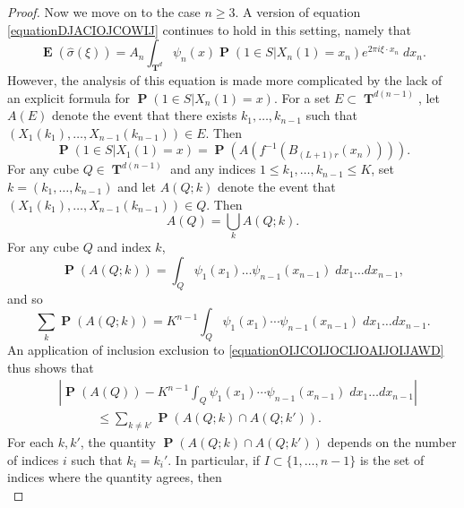 \documentclass[dvipsnames,letterpaper,12pt]{article}
\numberwithin{equation}{section}
\DeclareMathOperator{\TT}{\mathbf{T}}
\numberwithin{theorem}{section}
\DeclareMathOperator{\EE}{\mathbf{E}}
\DeclareMathOperator{\PP}{\mathbf{P}}
\begin{document}
\begin{proof}
    Now we move on to the case $n \geq 3$. A version of equation \eqref{equationDJACIOJCOWIJ} continues to hold in this setting, namely that
    \begin{equation} \label{equationGGIJICJIjjpopwaowarr}
        \EE(\widehat{\sigma}(\xi)) = A_n \int_{\TT^d} \psi_n(x) \PP(1 \in S| X_n(1) = x_n) e^{2 \pi i \xi \cdot x_n}\; dx_n.
    \end{equation}
    However, the analysis of this equation is made more complicated by the lack of an explicit formula for $\PP(1 \in S|X_n(1) = x)$. For a set $E \subset \TT^{d(n-1)}$, let $A(E)$ denote the event that there exists $k_1,\dots,k_{n-1}$ such that $(X_1(k_1),\dots,X_{n-1}(k_{n-1})) \in E$. Then
    \begin{equation}
        \PP( 1 \in S | X_1(1) = x ) = \PP(A(f^{-1}(B_{(L+1)r}(x_n)))).
    \end{equation}
    For any cube $Q \in \TT^{d(n-1)}$ and any indices $1 \leq k_1,\dots,k_{n-1} \leq K$, set $k = (k_1,\dots,k_{n-1})$ and let $A(Q;k)$ denote the event that $(X_1(k_1),\dots,X_{n-1}(k_{n-1})) \in Q$. Then
    \[ A(Q) = \bigcup_k A(Q;k). \]
    For any cube $Q$ and index $k$,
    \begin{equation}
        \PP(A(Q;k)) = \int_Q \psi_1(x_1) \dots \psi_{n-1}(x_{n-1})\; dx_1 \dots dx_{n-1},
    \end{equation}
    and so
    \begin{equation} \label{equationOIJCOIJOCIJOAIJOIJAWD}
        \sum_k \PP(A(Q;k)) = K^{n-1} \int_Q \psi_1(x_1) \cdots \psi_{n-1}(x_{n-1})\; dx_1 \dots dx_{n-1}.
    \end{equation}
    An application of inclusion exclusion to \eqref{equationOIJCOIJOCIJOAIJOIJAWD} thus shows that
    \begin{equation} \label{equationIOJVOIVJOVIJPSPOPCOISAPCOIACC}
    \begin{split}
        &\left| \PP(A(Q)) - K^{n-1} \int_Q \psi_1(x_1) \cdots \psi_{n-1}(x_{n-1})\; dx_1 \dots dx_{n-1} \right|\\
        &\quad\quad\quad\leq \sum_{k \neq k'} \PP(A(Q;k) \cap A(Q;k')).
    \end{split}
    \end{equation}
    For each $k,k'$, the quantity $\PP(A(Q;k) \cap A(Q;k'))$ depends on the number of indices $i$ such that $k_i = k_i'$. In particular, if $I \subset \{ 1, \dots, n-1 \}$ is the set of indices where the quantity agrees, then
    \begin{equation}

\end{equation}
\end{proof}
\end{document}
